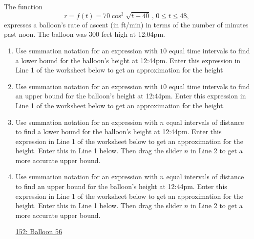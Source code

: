 \documentclass{ximera}
\begin{document}
\begin{question} \label{QOErermern333}
The function
\[
 r = f(t) = 70 \cos^3 \sqrt{t+40} \, , \, 0\leq t \leq 48,
\]
expresses a balloon’s rate of ascent (in ft/min) in terms of the number of minutes past noon. The balloon was 300 feet high at 12:04pm.

\begin{enumerate}
\item Use summation notation for an expression with $10$ equal time intervals to find a lower bound for the balloon's height at 12:44pm. Enter this expression in Line 1 of the worksheet below to get an  approximation for the height

\item Use summation notation for an expression with $10$ equal time intervals to find an upper bound for the balloon's height at 12:44pm. Enter this expression in Line 1 of the worksheet below to get an  approximation for the  height.


\item Use summation notation for an expression with $n$ equal intervals of distance to find a lower bound for the balloon's height at 12:44pm. Enter this expression in Line 1 of the worksheet below to get an  approximation for the height. Enter this in Line 1 below. Then drag the slider $n$ in Line 2 to get a more accurate upper bound.

\item Use summation notation for an expression with $n$ equal intervals of distance to find an upper bound for the balloon's height at 12:44pm. Enter this expression in Line 1 of the worksheet below to get an  approximation for the height. Enter this in Line 1 below. Then drag the slider $n$ in Line 2 to get a more accurate upper bound.

\begin{onlineOnly}
    \begin{center}
\end{center}
\end{onlineOnly}
 
\href{https://www.desmos.com/calculator/qwuqprd9vf}{152: Balloon 56}

 
\end{enumerate}
\end{question}
\end{document}
